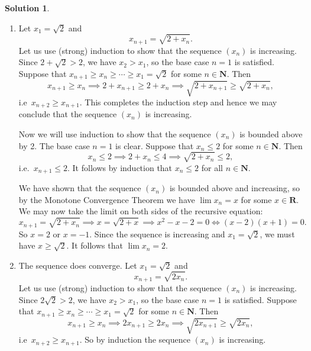 \documentclass[12pt]{article}
\theoremstyle{definition}
\theoremstyle{exercise}
\theoremstyle{solution}
\newtheorem*{solution}{Solution}
\newcommand{\N}{\mathbf{N}}
\newcommand{\R}{\mathbf{R}}
\begin{document}
\begin{solution}
    \begin{enumerate}
        \item Let \( x_1 = \sqrt{2} \) and
        \[
            x_{n+1} = \sqrt{2 + x_n}.
        \]
        Let us use (strong) induction to show that the sequence \( (x_n) \) is increasing. Since \( 2 + \sqrt{2} > 2 \), we have \( x_2 > x_1 \), so the base case \( n = 1 \) is satisfied. Suppose that \( x_{n+1} \geq x_n \geq \cdots \geq x_1 = \sqrt{2} \) for some \( n \in \N \). Then
        \[
            x_{n+1} \geq x_n \implies 2 + x_{n+1} \geq 2 + x_n \implies \sqrt{2 + x_{n+1}} \geq \sqrt{2 + x_n},
        \]
        i.e\ \( x_{n+2} \geq x_{n+1} \). This completes the induction step and hence we may conclude that the sequence \( (x_n) \) is increasing.
        
        Now we will use induction to show that the sequence \( (x_n) \) is bounded above by 2. The base case \( n = 1 \) is clear. Suppose that \( x_n \leq 2 \) for some \( n \in \N \). Then
        \[
            x_n \leq 2 \implies 2 + x_n \leq 4 \implies \sqrt{2 + x_n} \leq 2,
        \]
        i.e.\ \( x_{n+1} \leq 2 \). It follows by induction that \( x_n \leq 2 \) for all \( n \in \N \).

        We have shown that the sequence \( (x_n) \) is bounded above and increasing, so by the Monotone Convergence Theorem we have \( \lim x_n = x \) for some \( x \in \R \). We may now take the limit on both sides of the recursive equation:
        \[
            x_{n+1} = \sqrt{2 + x_n} \implies x = \sqrt{2 + x} \implies x^2 - x - 2 = 0 \iff (x - 2)(x + 1) = 0.
        \]
        So \( x = 2 \) or \( x = -1 \). Since the sequence is increasing and \( x_1 = \sqrt{2} \), we must have \( x \geq \sqrt{2} \). It follows that \( \lim x_n = 2 \).

        \item The sequence does converge. Let \( x_1 = \sqrt{2} \) and
        \[
            x_{n+1} = \sqrt{2 x_n}.
        \]
        Let us use (strong) induction to show that the sequence \( (x_n) \) is increasing. Since \( 2 \sqrt{2} > 2 \), we have \( x_2 > x_1 \), so the base case \( n = 1 \) is satisfied. Suppose that \( x_{n+1} \geq x_n \geq \cdots \geq x_1 = \sqrt{2} \) for some \( n \in \N \). Then
        \[
            x_{n+1} \geq x_n \implies 2 x_{n+1} \geq 2 x_n \implies \sqrt{2 x_{n+1}} \geq \sqrt{2 x_n},
        \]
        i.e\ \( x_{n+2} \geq x_{n+1} \). So by induction the sequence \( (x_n) \) is increasing.
        

\end{enumerate}
\end{solution}
\end{document}
